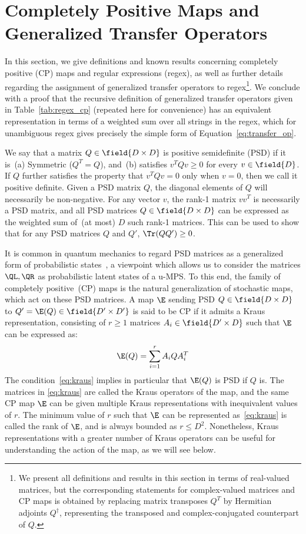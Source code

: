 \section{Completely Positive Maps and Generalized Transfer Operators}
\label{sec:appendix_a}

In this section, we give definitions and known results concerning completely positive (CP) maps and regular expressions (regex), as well as further details regarding the assignment of generalized transfer operators to regex\footnote{We present all definitions and results in this section in terms of real-valued matrices, but the corresponding statements for complex-valued matrices and CP maps is obtained by replacing matrix transposes $Q^T$ by Hermitian adjoints $Q^\dagger$, representing the transposed and complex-conjugated counterpart of $Q$.}. We conclude with a proof that the recursive definition of generalized transfer operators given in Table~\ref{tab:regex_cp}
(repeated here for convenience) has an equivalent representation in terms of a weighted sum over all strings in the regex, which for unambiguous regex gives precisely the simple form of Equation~\ref{eq:transfer_op}.

We say that a matrix $Q\in\field{D\times D}$ is positive semidefinite (PSD) if it is~(a) Symmetric ($Q^T = Q$), and~(b) satisfies $v^T Q v \geq 0$ for every $v\in\field{D}$. If $Q$ further satisfies the property that $v^T Q v = 0$ only when $v = 0$, then we call it positive definite. Given a PSD matrix $Q$, the diagonal elements of $Q$ will necessarily be non-negative. For any vector $v$, the rank-1 matrix $vv^T$ is necessarily a PSD matrix, and all PSD matrices $Q\in\field{D\times D}$ can be expressed as the weighted sum of~(at most) $D$ such rank-1 matrices. This can be used to show that for any PSD matrices $Q$ and $Q'$, $\Tr(QQ') \geq0$.

It is common in quantum mechanics to regard PSD matrices as a generalized form of probabilistic states~\citep{nielsen2002}, a viewpoint which allows us to consider the matrices $\QL, \QR$ as probabilistic latent states of a u-MPS. To this end, the family of completely positive~(CP) maps is the natural generalization of stochastic maps, which act on these PSD matrices. A map $\E$ sending PSD $Q\in\field{D\times D}$ to $Q'=\E(Q)\in\field{D'\times D'}$ is said to be CP if it admits a Kraus representation, consisting of $r \geq 1$ matrices $A_i\in\field{D'\times D}$ such that $\E$ can be expressed as:
%
\begin{equation}
\label{eq:kraus}
\E(Q) = \sum_{i=1}^r A_i Q A_i^T
\end{equation}
%
The condition~\eqref{eq:kraus} implies in particular that $\E(Q)$ is PSD if $Q$ is. The matrices in \eqref{eq:kraus} are called the Kraus operators of the map, and the same CP map $\E$ can be given multiple Kraus representations with inequivalent values of $r$. The minimum value of $r$ such that $\E$ can be represented as~\eqref{eq:kraus} is called the rank of $\E$, and is always bounded as $r \leq D^2$. Nonetheless, Kraus representations with a greater number of Kraus operators can be useful for understanding the action of the map, as we will see below.

